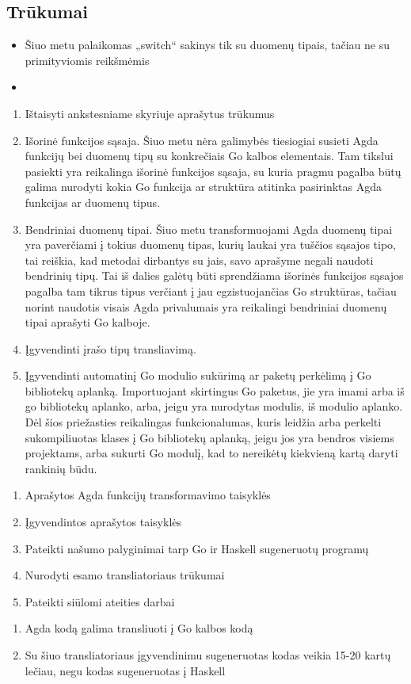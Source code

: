 \documentclass{VUMIFPSkursinis}
\begin{document}
\subsection{Trūkumai}
\begin{itemize}
	\item Šiuo metu palaikomas „switch“ sakinys tik su duomenų tipais, tačiau ne su primityviomis reikšmėmis
	\item 
\end{itemize}
\begin{enumerate}[noitemsep]
	\item Ištaisyti ankstesniame skyriuje aprašytus trūkumus
  \item Išorinė funkcijos sąsaja. Šiuo metu nėra galimybės tiesiogiai susieti Agda funkcijų bei duomenų tipų su konkrečiais Go kalbos elementais. Tam tikslui pasiekti yra reikalinga išorinė funkcijos sąsaja, su kuria pragmu pagalba būtų galima nurodyti kokia Go funkcija ar struktūra atitinka pasirinktas Agda funkcijas ar duomenų tipus.
  \item Bendriniai duomenų tipai. Šiuo metu transformuojami Agda duomenų tipai yra paverčiami į tokius duomenų tipas, kurių laukai yra tuščios sąsajos tipo, tai reiškia, kad metodai dirbantys su jais, savo aprašyme negali naudoti bendrinių tipų. Tai iš dalies galėtų būti sprendžiama išorinės funkcijos sąsajos pagalba tam tikrus tipus verčiant į jau egzistuojančias Go struktūras, tačiau norint naudotis visais Agda privalumais yra reikalingi bendriniai duomenų tipai  aprašyti Go kalboje.
  \item Įgyvendinti įrašo tipų transliavimą. 
  \item Įgyvendinti automatinį Go modulio sukūrimą ar paketų perkėlimą į Go bibliotekų aplanką. Importuojant skirtingus Go paketus, jie yra imami arba iš go bibliotekų aplanko, arba, jeigu yra nurodytas modulis, iš modulio aplanko. Dėl šios priežasties reikalingas funkcionalumas, kuris leidžia arba perkelti sukompiliuotas klases į Go bibliotekų aplanką, jeigu jos yra bendros visiems projektams, arba sukurti Go modulį, kad to nereikėtų kiekvieną kartą daryti rankinių būdu.
\end{enumerate}
\begin{enumerate}[noitemsep]
  \item Aprašytos Agda funkcijų transformavimo taisyklės
  \item Įgyvendintos aprašytos taisyklės
  \item Pateikti našumo palyginimai tarp Go ir Haskell sugeneruotų programų
  \item Nurodyti esamo transliatoriaus trūkumai
  \item Pateikti siūlomi ateities darbai
\end{enumerate}
\begin{enumerate}[noitemsep]
  \item Agda kodą galima transliuoti į Go kalbos kodą
  \item Su šiuo transliatoriaus įgyvendinimu sugeneruotas kodas veikia 15-20 kartų lečiau, negu kodas sugeneruotas į Haskell
\end{enumerate}
\end{document}
